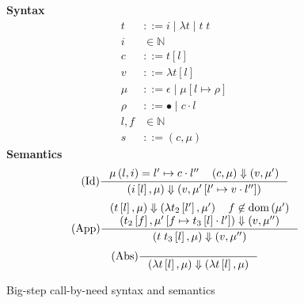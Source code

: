 \begin{figure}
\textbf{Syntax}
\begin{align*}
\tag{Term} t &::= i \; | \; \lambda t \; | \; t \; t  \\
\tag{Variable} i &\in \mathbb{N}  \\
\tag{Closure} c &::= t \left[l\right] \\
\tag{Value} v &::= \lambda t \left[l\right] \\
\tag{Heap} \mu &::= \epsilon \; | \; \mu \left[ l \mapsto \rho \right] \\
\tag{Environment} \rho &::= \bullet \; | \; c \cdot l \\
\tag{Location} l,f &\in \mathbb{N}  \\
\tag{Configuration} s &::= \left(c, \mu \right)
\end{align*}
\textbf{Semantics}
\begin{align*}
\tag{Id} \inference
{\mu \left( l, i \right) = l' \mapsto c \cdot l'' \quad 
 \left(c, \mu\right) \Downarrow \left(v, \mu'\right)}
{\left(i\left[l\right],\mu\right) \Downarrow \left(v, \mu'\left[l' \mapsto v \cdot l''\right]\right)}
\end{align*}
\begin{align*}
\tag{App} \inference
{\left(t\left[l\right], \mu\right) \Downarrow \left(\lambda t_2\left[l'\right], \mu'\right) 
   \quad f \not \in \textnormal{dom}\left(\mu'\right)
   \\ \left(t_2\left[f\right], \mu'\left[f \mapsto t_3\left[l\right] \cdot l'\right]\right)
         \Downarrow 
      \left(v, \mu'' \right) 
   }
{\left(t \; t_3\left[l\right], \mu\right) \Downarrow \left(v, \mu'' \right)}  
\end{align*}
\begin{align*}
\tag{Abs} \inference {} {\left(\lambda t\left[l\right], \mu\right) \Downarrow \left(\lambda t\left[l\right], \mu\right)}
\end{align*}
\caption{Big-step call-by-need \ce syntax and semantics}
\label{fig:bigstep}
\end{figure}


